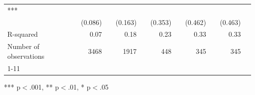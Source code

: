 \documentclass{article}
\begin{document}
\begin{table}[!h]
\begin{tabular}{lllllllllll}
  \multicolumn{1}{l}{***} \\
\multicolumn{1}{l}{} &
  \multicolumn{1}{r}{(0.086)} &
  \multicolumn{1}{l}{} &
  \multicolumn{1}{r}{(0.163)} &
  \multicolumn{1}{l}{} &
  \multicolumn{1}{r}{(0.353)} &
  \multicolumn{1}{l}{} &
  \multicolumn{1}{r}{(0.462)} &
  \multicolumn{1}{l}{} &
  \multicolumn{1}{r}{(0.463)} &
  \multicolumn{1}{l}{} \\
\multicolumn{1}{l}{R-squared} &
  \multicolumn{1}{r}{0.07} &
  \multicolumn{1}{l}{} &
  \multicolumn{1}{r}{0.18} &
  \multicolumn{1}{l}{} &
  \multicolumn{1}{r}{0.23} &
  \multicolumn{1}{l}{} &
  \multicolumn{1}{r}{0.33} &
  \multicolumn{1}{l}{} &
  \multicolumn{1}{r}{0.33} &
  \multicolumn{1}{l}{} \\
\multicolumn{1}{l}{Number of observations} &
  \multicolumn{1}{r}{3468} &
  \multicolumn{1}{l}{} &
  \multicolumn{1}{r}{1917} &
  \multicolumn{1}{l}{} &
  \multicolumn{1}{r}{448} &
  \multicolumn{1}{l}{} &
  \multicolumn{1}{r}{345} &
  \multicolumn{1}{l}{} &
  \multicolumn{1}{r}{345} &
  \multicolumn{1}{l}{} \\
\cline{1-11}
\end{tabular}

\footnotesize{
*** p$<$.001, ** p$<$.01, * p$<$.05
}
\end{table}
\end{document}
